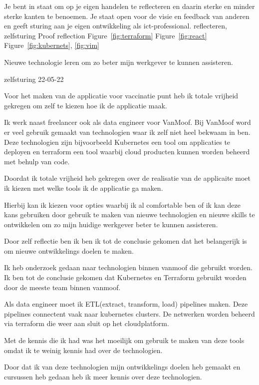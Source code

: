 \competentie
{%
	\competentieformulier
	{%
		Je bent in staat om op je eigen handelen te reflecteren
		en daarin sterke en minder sterke kanten te
		benoemen. Je staat open voor de visie en feedback
		van anderen en geeft sturing aan je eigen ontwikkeling
		als ict-professional.
	}
	{%
		reflecteren,
		zelfsturing
	}
	{%
		Proof
	}
	{%
		reflection
	}
	{%
		Figure~\ref{fig:terraform}
		Figure~\ref{fig:react}
		Figure~\ref{fig:kubernets},
		\ref{fig:vim}
	}
}
{%
	\bewijs
	{
		Nieuwe technologie leren om zo beter mijn werkgever te kunnen assisteren.
	}
	{%
		\starr
		{%
			zelfsturing
		}
		{%
			22-05-22
		}
		{%
			Voor het maken van de applicatie voor vaccinatie punt heb ik totale vrijheid gekregen om zelf te kiezen hoe ik de applicatie maak.

			Ik werk naast freelancer ook als data engineer voor VanMoof.
			Bij VanMoof word er veel gebruik gemaakt van technologien waar ik zelf niet heel bekwaam in ben.
			Deze technologien zijn bijvoorbeeld Kubernetes een tool om applicaties te deployen en terraform een tool waarbij cloud producten kunnen worden beheerd met behulp van code.
		}
		{%
			Doordat ik totale vrijheid heb gekregen over de realisatie van de applicaite moet ik kiezen met welke tools ik de applicatie ga maken.


			Hierbij kan ik kiezen voor opties waarbij ik al comfortable ben of ik kan deze kans gebruiken door gebruik te maken van nieuwe technologien en nieuwe skills te ontwikkelen om zo mijn huidige werkgever beter te kunnen assisteren.

			Door zelf reflectie ben ik ben ik tot de conclusie gekomen dat het belangerijk is om nieuwe ontwikkelings doelen te maken.

		}
		{%
			Ik heb onderzoek gedaan naar technologien binnen vanmoof die gebruikt worden.
			Ik ben tot de conclusie gekomen dat Kubernetes en Terraform gebruikt worden door de meeste team binnen vanmoof.

			Als data engineer moet ik ETL(extract, transform, load) pipelines maken. Deze pipelines connectent vaak naar kubernetes clusters.
			De netwerken worden beheerd via terraform die weer aan sluit op het cloudplatform.

			Met de kennis die ik had was het moeilijk om gebruik te maken van deze tools omdat ik te weinig kennis had over de technologien.

			Door dat ik van deze technologien mijn ontwikkelings doelen heb gemaakt en cursussen heb gedaan heb ik meer kennis over deze technologien.

}}}
